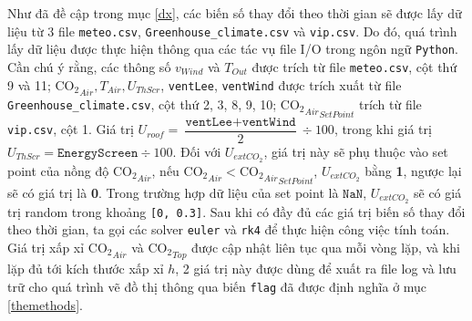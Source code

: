 \documentclass[a4paper]{article}
\begin{document}
Như đã đề cập trong mục \ref{dx}, các biến số thay đổi theo thời gian sẽ được lấy dữ liệu từ 3 file \texttt{meteo.csv}, \texttt{Greenhouse\_climate.csv} và \texttt{vip.csv}. Do đó, quá trình lấy dữ liệu được thực hiện thông qua các tác vụ file I/O trong ngôn ngữ \texttt{Python}. Cần chú ý rằng, các thông số $v_{Wind}$ và $T_{Out}$ được trích từ file \texttt{meteo.csv}, cột thứ 9 và 11; $\mathrm{CO_{2}}_{Air}, T_{Air}, U_{ThScr}$, \texttt{ventLee}, \texttt{ventWind} được trích xuất từ file \texttt{Greenhouse\_climate.csv}, cột thứ 2, 3, 8, 9, 10; ${\mathrm{CO_{2}}_{Air}}_{SetPoint}$ trích từ file \texttt{vip.csv}, cột 1. Giá trị $U_{roof} = \dfrac{\texttt{ventLee} + \texttt{ventWind}}{2} \div 100$, trong khi giá trị $U_{ThScr} = \texttt{EnergyScreen} \div 100$. Đối với $U_{extCO_{2}}$, giá trị này sẽ phụ thuộc vào set point của nồng độ $\mathrm{CO_{2}}_{Air}$, nếu $\mathrm{CO_{2}}_{Air} < {\mathrm{CO_{2}}_{Air}}_{SetPoint}$, $U_{extCO_{2}}$ bằng \textbf{1}, ngược lại sẽ có giá trị là \textbf{0}. Trong trường hợp dữ liệu của set point là $\texttt{NaN}$, $U_{extCO_{2}}$ sẽ có giá trị random trong khoảng \texttt{[0, 0.3]}. Sau khi có đầy đủ các giá trị biến số thay đổi theo thời gian, ta gọi các solver \texttt{euler} và \texttt{rk4} để thực hiện công việc tính toán. Giá trị xấp xỉ $\mathrm{CO_{2}}_{Air}$ và $\mathrm{CO_{2}}_{Top}$ được cập nhật liên tục qua mỗi vòng lặp, và khi lặp đủ tới kích thước xấp xỉ $h$, 2 giá trị này được dùng để xuất ra file log và lưu trữ cho quá trình vẽ đồ thị thông qua biến \texttt{flag} đã được định nghĩa ở mục \ref{themethods}. \par
\end{document}
